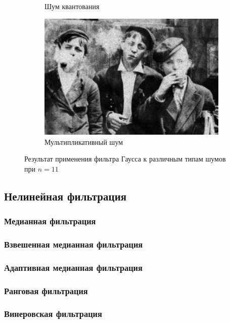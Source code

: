 \begin{figure}[ht]
\begin{subfigure}[b]{0.5\linewidth}
      \caption{Шум квантования} 
      \label{gaussian_11:e}
    \end{subfigure}%
    \begin{subfigure}[b]{0.5\linewidth}
        \centering
        \includegraphics[width=0.95\linewidth]{../Gaussian_Blur/Gaussian_Blur_Speckle_noise_(11,11).jpg} 
        \caption{Мультипликативный шум} 
        \label{gaussian_11:f} 
    \end{subfigure} 
    \caption{Результат применения фильтра Гаусса к различным типам шумов при $n = 11$}
    \label{img:gaussian_11} 
  \end{figure}
  \FloatBarrier

\subsection{Нелинейная фильтрация}
\subsubsection{Медианная фильтрация}

\subsubsection{Взвешенная медианная фильтрация}
\subsubsection{Адаптивная медианная фильтрация}
\subsubsection{Ранговая фильтрация}
\subsubsection{Винеровская фильтрация}

